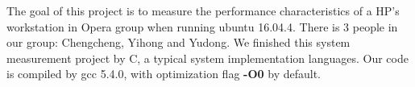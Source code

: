 
The goal of this project is to measure the performance characteristics of a HP's workstation in Opera group when running ubuntu 16.04.4. There is 3 people in our group: Chengcheng, Yihong and Yudong. We finished this system measurement project by C, a typical system implementation languages. Our code is compiled by gcc 5.4.0, with optimization flag \textbf{-O0} by default.
